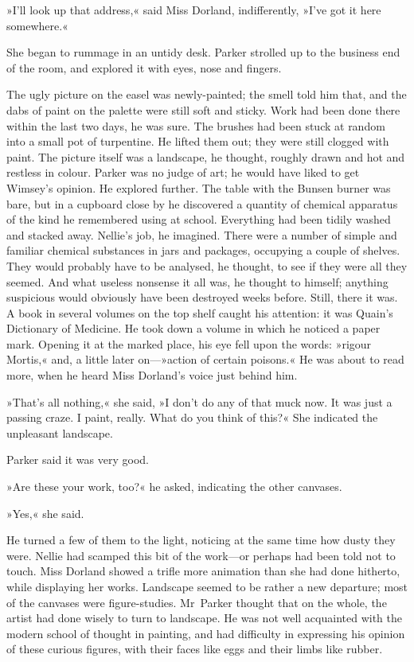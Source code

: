 »I'll look up that address,« said Miss Dorland, indifferently, »I've got it here somewhere.«

She began to rummage in an untidy desk. Parker strolled up to the business end of the room, and explored it with eyes, nose and fingers.

The ugly picture on the easel was newly-painted; the smell told him that, and the dabs of paint on the palette were still soft and sticky. Work had been done there within the last two days, he was sure. The brushes had been stuck at random into a small pot of turpentine. He lifted them out; they were still clogged with paint. The picture itself was a landscape, he thought, roughly drawn and hot and restless in colour. Parker was no judge of art; he would have liked to get Wimsey's opinion. He explored further. The table with the Bunsen burner was bare, but in a cupboard close by he discovered a quantity of chemical apparatus of the kind he remembered using at school. Everything had been tidily washed and stacked away. Nellie's job, he imagined. There were a number of simple and familiar chemical substances in jars and packages, occupying a couple of shelves. They would probably have to be analysed, he thought, to see if they were all they seemed. And what useless nonsense it all was, he thought to himself; anything suspicious would obviously have been destroyed weeks before. Still, there it was. A book in several volumes on the top shelf caught his attention: it was Quain's Dictionary of Medicine. He took down a volume in which he noticed a paper mark. Opening it at the marked place, his eye fell upon the words: »rigour Mortis,« and, a little later on—»action of certain poisons.« He was about to read more, when he heard Miss Dorland's voice just behind him.

»That's all nothing,« she said, »I don't do any of that muck now. It was just a passing craze. I paint, really. What do you think of this?« She indicated the unpleasant landscape.

Parker said it was very good.

»Are these your work, too?« he asked, indicating the other canvases.

»Yes,« she said.

He turned a few of them to the light, noticing at the same time how dusty they were. Nellie had scamped this bit of the work—or perhaps had been told not to touch. Miss Dorland showed a trifle more animation than she had done hitherto, while displaying her works. Landscape seemed to be rather a new departure; most of the canvases were figure-studies. Mr~Parker thought that on the whole, the artist had done wisely to turn to landscape. He was not well acquainted with the modern school of thought in painting, and had difficulty in expressing his opinion of these curious figures, with their faces like eggs and their limbs like rubber.

